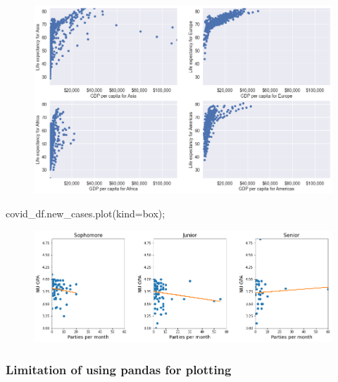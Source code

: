 \documentclass[
  letterpaper,
  DIV=11,
  numbers=noendperiod]{scrreprt}
\newenvironment{Shaded}{\begin{snugshade}}{\end{snugshade}}
\newcommand{\NormalTok}[1]{\textcolor[rgb]{0.00,0.23,0.31}{#1}}
\newcommand{\OperatorTok}[1]{\textcolor[rgb]{0.37,0.37,0.37}{#1}}
\newcommand{\StringTok}[1]{\textcolor[rgb]{0.13,0.47,0.30}{#1}}
\begin{document}
\begin{figure}[H]

{\centering \includegraphics{Data visualization_files/figure-pdf/cell-11-output-1.png}

}

\end{figure}

\begin{Shaded}
\begin{Highlighting}[]
\NormalTok{covid\_df.new\_cases.plot(kind}\OperatorTok{=}\StringTok{\textquotesingle{}box\textquotesingle{}}\NormalTok{)}\OperatorTok{;}
\end{Highlighting}
\end{Shaded}

\begin{figure}[H]

{\centering \includegraphics{Data visualization_files/figure-pdf/cell-12-output-1.png}

}

\end{figure}

\hypertarget{limitation-of-using-pandas-for-plotting}{%
\subsubsection{Limitation of using pandas for
plotting}\label{limitation-of-using-pandas-for-plotting}}
\end{document}
